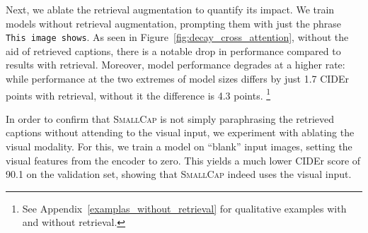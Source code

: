 \documentclass[10pt,twocolumn,letterpaper]{article}
\newcommand{\model}{\textsc{SmallCap}\xspace}
\begin{document}
Next, we ablate the retrieval augmentation to quantify its impact. We train models without retrieval augmentation, prompting them with just the phrase \texttt{This image shows}. %
As seen in Figure~\ref{fig:decay_cross_attention}, without the aid of retrieved captions, there is a notable drop in performance compared to results with retrieval. Moreover, model performance degrades at a higher rate: while performance at the two extremes of model sizes differs by just 1.7 CIDEr points with retrieval, without it the difference is 4.3 points.%
\footnote{See Appendix~\ref{examplas_without_retrieval} for qualitative examples with and without retrieval.}

\begin{table}[]
\centering
    \caption{Results with different decoders on the COCO test set.%
    }
    \label{tab:diff_dec}
\end{table}

In order to confirm that \model is not simply paraphrasing the retrieved captions without attending to the visual input, we experiment with ablating the visual modality. For this, we train a model on ``blank'' input images, setting the visual features from the encoder to zero. This yields a much lower CIDEr score of 90.1 on the validation set, showing that \model indeed uses the visual input.
\end{document}
